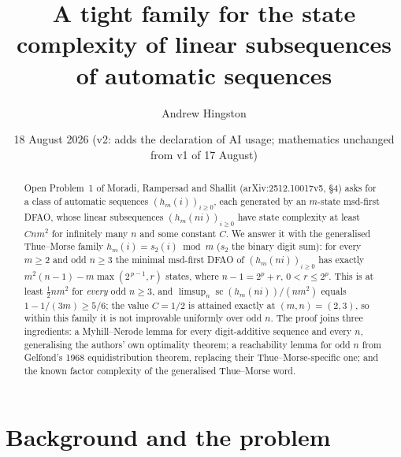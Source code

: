 \documentclass[10pt,reqno]{amsart}
\theoremstyle{plain}
\theoremstyle{definition}
\theoremstyle{remark}
\numberwithin{theorem}{section}
\DeclareMathOperator{\sco}{sc}
\begin{document}
\title[A tight family for linear subsequences]{A tight family for the state complexity of
linear subsequences of automatic sequences}

\author{Andrew Hingston}

\date{18 August 2026 (v2: adds the declaration of AI usage; mathematics unchanged from v1 of 17 August)}


\begin{abstract}
Open Problem~1 of Moradi, Rampersad and Shallit (arXiv:2512.10017v5, \S4) asks for a class
of automatic sequences $(h_m(i))_{i \ge 0}$, each generated by an $m$-state msd-first DFAO,
whose linear subsequences $(h_m(ni))_{i \ge 0}$ have state complexity at least $Cnm^2$ for
infinitely many $n$ and some constant $C$. We answer it with the generalised Thue--Morse
family $h_m(i) = s_2(i) \bmod m$ ($s_2$ the binary digit sum): for every $m \ge 2$ and odd
$n \ge 3$ the minimal msd-first DFAO of $(h_m(ni))_{i \ge 0}$ has exactly
$m^2(n-1) - m\max(2^{\,p-1}, r)$ states, where $n - 1 = 2^p + r$, $0 < r \le 2^p$.
This is at least $\tfrac12 n m^2$ for \emph{every} odd $n \ge 3$, and
$\limsup_{n} \sco(h_m(ni))/(nm^2)$ equals $1 - 1/(3m) \ge 5/6$; the value $C = 1/2$ is attained
exactly at $(m,n) = (2,3)$, so within this family it is not improvable uniformly over odd
$n$. The proof joins three ingredients: a Myhill--Nerode lemma for every digit-additive
sequence and every $n$, generalising the authors' own optimality theorem; a reachability
lemma for odd $n$ from Gelfond's 1968 equidistribution theorem, replacing their
Thue--Morse-specific one; and the known factor complexity of the generalised Thue--Morse
word.
\end{abstract}

\maketitle

\section{Background and the problem}
\label{sec:bg}
\end{document}
